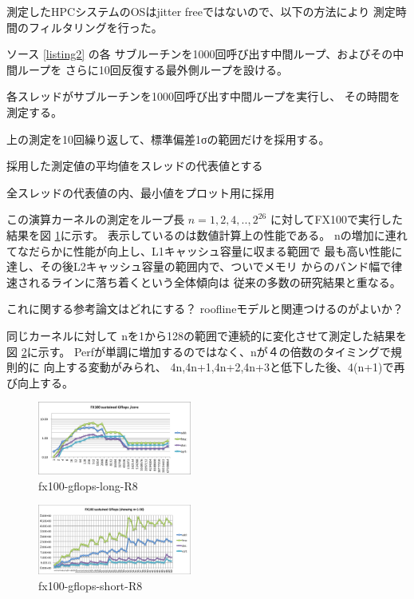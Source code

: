\documentclass[submit,techrep,noauthor]{ipsj}
\begin{document}
測定したHPCシステムのOSはjitter freeではないので、以下の方法により
測定時間のフィルタリングを行った。

ソース \lstlistingname \ref{listing2} の各
サブルーチンを1000回呼び出す中間ループ、およびその中間ループを
さらに10回反復する最外側ループを設ける。
\begin{itemize}
{
\item {各スレッドがサブルーチンを1000回呼び出す中間ループを実行し、
		その時間を測定する。}
\item {上の測定を10回繰り返して、標準偏差1σの範囲だけを採用する。}
\item {採用した測定値の平均値をスレッドの代表値とする}
\item {全スレッドの代表値の内、最小値をプロット用に採用}
}
\end{itemize}


この演算カーネルの測定をループ長
\begin{math}
n=1,2,4,..,2^{26}
\end{math}
に対してFX100で実行した結果を図 \ref{fig:fx100-gflops-long-R8}に示す。
表示しているのは数値計算上の性能である。
nの増加に連れてなだらかに性能が向上し、L1キャッシュ容量に収まる範囲で
最も高い性能に達し、その後L2キャッシュ容量の範囲内で、ついでメモリ
からのバンド幅で律速されるラインに落ち着くという全体傾向は
従来の多数の研究結果と重なる。

{\color{blue} \par
これに関する参考論文はどれにする？
rooflineモデルと関連つけるのがよいか？
} \par

同じカーネルに対して
nを1から128の範囲で連続的に変化させて測定した結果を
図 \ref{fig:fx100-gflops-short-R8}に示す。
Perfが単調に増加するのではなく、nが４の倍数のタイミングで規則的に
向上する変動がみられ、
4n,4n+1,4n+2,4n+3と低下した後、4(n+1)で再び向上する。

\begin{figure}[tb]
\centering\includegraphics[width=0.45\textwidth]{figs/fx100-gflops-long-R8}
\caption{fx100-gflops-long-R8}
\label{fig:fx100-gflops-long-R8}
\end{figure}

\begin{figure}[tb]
\centering\includegraphics[width=0.45\textwidth]{figs/fx100-gflops-short-R8}
\caption{fx100-gflops-short-R8}
\label{fig:fx100-gflops-short-R8}
\end{figure}
\end{document}
